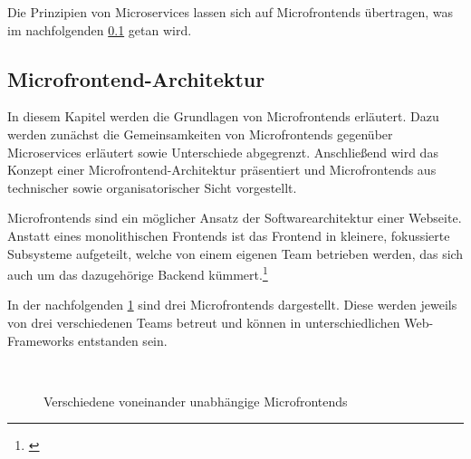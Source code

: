 Die Prinzipien von Microservices lassen sich auf Microfrontends übertragen, was im nachfolgenden \cref{sec:MicrofrontendArchitektur} getan wird.

\subsection{Microfrontend-Architektur}\label{sec:MicrofrontendArchitektur}

In diesem Kapitel werden die Grundlagen von Microfrontends erläutert. Dazu werden zunächst die Gemeinsamkeiten von Microfrontends gegenüber Microservices erläutert sowie Unterschiede abgegrenzt. Anschließend wird das Konzept einer Microfrontend-Architektur präsentiert und Microfrontends aus technischer sowie organisatorischer Sicht vorgestellt.

Microfrontends sind ein möglicher Ansatz der Softwarearchitektur einer Webseite. Anstatt eines monolithischen Frontends ist das Frontend in kleinere, fokussierte Subsysteme aufgeteilt, welche von einem eigenen Team betrieben werden, das sich auch um das dazugehörige Backend kümmert.\footnote{\cite[vgl.][21\psq]{Geers2020}}

In der nachfolgenden \cref{fig:fragments} sind drei Microfrontends dargestellt. Diese werden jeweils von drei verschiedenen Teams betreut und können in unterschiedlichen Web-Frameworks entstanden sein.

\begin{figure}[hbt!]
	\centering
	\begin{minipage}[t]{0.8\textwidth}	
		\caption{Verschiedene voneinander unabhängige Microfrontends}
		\\ %
		\label{fig:fragments}
	\end{minipage}
\end{figure}

